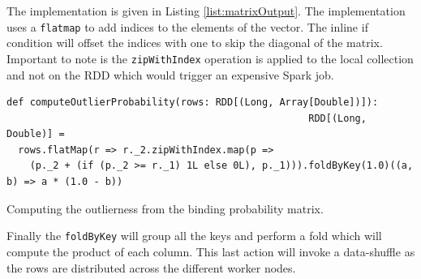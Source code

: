 The implementation is given in Listing \ref{list:matrixOutput}. The implementation uses a \texttt{flatmap} to add indices to the elements of the vector. The inline if condition will offset the indices with one to skip the diagonal of the matrix. Important to note is the \texttt{zipWithIndex} operation is applied to the local collection and not on the RDD which would trigger an expensive Spark job.

\begin{listing}[ht!]
\begin{verbatim}
def computeOutlierProbability(rows: RDD[(Long, Array[Double])]):
                                                    RDD[(Long, Double)] =
  rows.flatMap(r => r._2.zipWithIndex.map(p =>
    (p._2 + (if (p._2 >= r._1) 1L else 0L), p._1))).foldByKey(1.0)((a, b) => a * (1.0 - b))
\end{verbatim}

\caption{Computing the outlierness from the binding probability matrix.}
\label{list:matrixOutput}
\end{listing}

Finally the \texttt{foldByKey} will group all the keys and perform a fold which will compute the product of each column. This last action will invoke a data-shuffle as the rows are distributed across the different worker nodes.